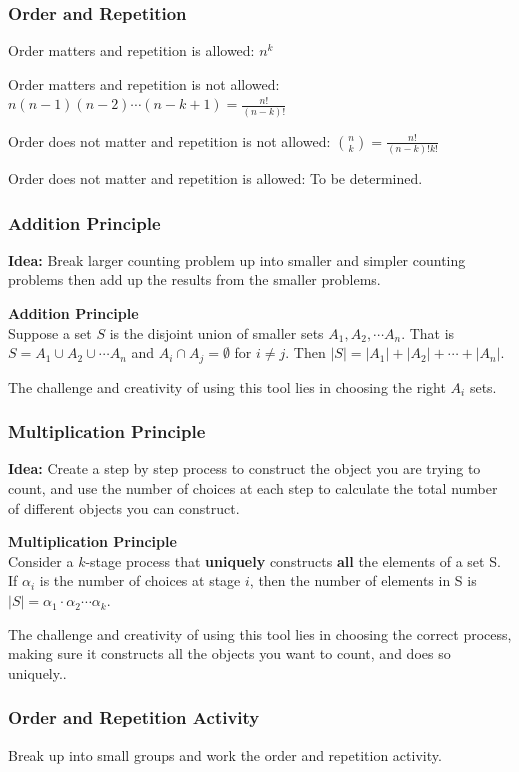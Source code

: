\documentclass[xcolor=table]{beamer}
\begin{document}
\frame
{
  \frametitle{Order and Repetition}

Order matters and repetition is allowed: $n^k$ \vfill

Order matters and repetition is not allowed: $n(n-1)(n-2)\cdots(n-k+1)=\frac{n!}{(n-k)!}$\vfill

Order does not matter and repetition is not allowed: $\binom{n}{k}=\frac{n!}{(n-k)!k!}$\vfill

Order does not matter and repetition is allowed:  To be determined.

}


\frame
{
  \frametitle{Addition Principle}

{\bf Idea:}  Break larger counting problem up into smaller and simpler counting problems then add up the results from the smaller problems. \vfill


{\bf Addition Principle}\\
Suppose a set $S$ is the disjoint union of smaller sets $A_1, A_2, \cdots A_n$. That is $S= A_1\cup A_2\cup \cdots A_n$ and $A_i \cap A_j = \emptyset$ for $i \neq j$. Then $|S|=|A_1|+ |A_2| + \cdots + |A_n|$.
\vfill

The challenge and creativity of using this tool lies in choosing the right $A_i$ sets.
}

\frame
{
  \frametitle{Multiplication Principle}

{\bf Idea:}  Create a step by step process to construct the object you are trying to count, and use the number of choices at each step to calculate the total number of different objects you can construct. \vfill


{\bf Multiplication Principle}\\
Consider a $k$-stage process that {\bf uniquely} constructs {\bf all} the elements of a set S.  If $\alpha_i$ is the number of choices at stage $i$, then the number of elements in S is $|S|=\alpha_1 \cdot \alpha_2 \cdots \alpha_k$.
\vfill

The challenge and creativity of using this tool lies in choosing the correct process, making sure it constructs all the objects you want to count, and does so uniquely..
}

\frame
{
  \frametitle{Order and Repetition Activity}

Break up into small groups and work the order and repetition activity.
}
\end{document}
